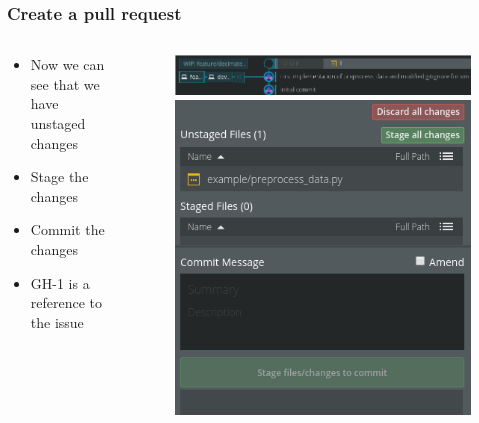 \begin{frame}
	\frametitle{Create a pull request}
	\begin{columns}
		\begin{column}{0.4\textwidth}
			\begin{itemize}[<+->]
				\item Now we can see that we have unstaged changes
				\item Stage the changes
				\item Commit the changes
				\item GH-1 is a reference to the issue
			\end{itemize}
		\end{column}
		\begin{column}{0.6\textwidth}
			\begin{figure}
				\centering
				\begin{overprint}
					\includegraphics[width=\textwidth]{./pictures/decimate_unstaged.png}
					\onslide<2>\includegraphics[width=\textwidth]{./pictures/stage_decimate.png}

\end{overprint}
\end{figure}
\end{column}
\end{columns}
\end{frame}
